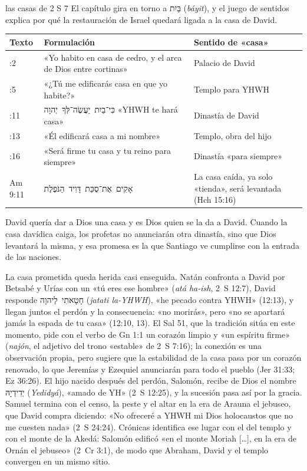 \documentclass[11pt,letterpaper]{article}
\newcommand{\heb}[1]{\mbox{\foreignlanguage{hebrew}{#1}}}
\begin{document}
\begin{perla}{las casas de 2 S 7}
El capítulo gira en torno a \heb{בַּיִת} (\emph{báyit}), y el juego de sentidos explica por qué la restauración de Israel quedará ligada a la casa de David.\par\smallskip
{\centering\renewcommand{\arraystretch}{1.15}
\begin{tabular}{>{\RaggedRight\arraybackslash}p{1.6cm}>{\RaggedRight\arraybackslash}p{7.4cm}>{\RaggedRight\arraybackslash}p{4.9cm}}
\toprule
\textbf{Texto} & \textbf{Formulación} & \textbf{Sentido de «casa»}\\
\midrule
7:2 & «Yo habito en casa de cedro, y el arca de Dios entre cortinas» & Palacio de David\\
7:5 & «¿Tú me edificarás casa en que yo habite?» & Templo para YHWH\\
7:11 & \heb{כִּי־בַיִת יַעֲשֶׂה־לְּךָ יְהוָה} «YHWH te hará casa» & Dinastía de David\\
7:13 & «Él edificará casa a mi nombre» & Templo, obra del hijo\\
7:16 & «Será firme tu casa y tu reino para siempre» & Dinastía «para siempre»\\
Am 9:11 & \heb{אָקִים אֶת־סֻכַּת דָּוִיד הַנֹּפֶלֶת} & La casa caída, ya solo «tienda», será levantada (Hch 15:16)\\
\bottomrule
\end{tabular}\par}
\smallskip
David quería dar a Dios una casa y es Dios quien se la da a David. Cuando la casa davídica caiga, los profetas no anunciarán otra dinastía, sino que Dios levantará la misma, y esa promesa es la que Santiago ve cumplirse con la entrada de las naciones.
\end{perla}

La casa prometida queda herida casi enseguida. Natán confronta a David por Betsabé y Urías con un «tú eres ese hombre» (\emph{atá ha-ish}, 2~S 12:7), David responde \heb{חָטָאתִי לַיהוָה} (\emph{jatati la-YHWH}), «he pecado contra YHWH» (12:13), y llegan juntos el perdón y la consecuencia: «no morirás», pero «no se apartará jamás la espada de tu casa» (12:10, 13). El Sal 51, que la tradición sitúa en este momento, pide con el verbo de Gn 1:1 un corazón limpio y «un espíritu firme» (\emph{najón}, el adjetivo del trono «estable» de 2~S 7:16); la conexión es una observación propia, pero sugiere que la estabilidad de la casa pasa por un corazón renovado, lo que Jeremías y Ezequiel anunciarán para todo el pueblo (Jer 31:33; Ez 36:26). El hijo nacido después del perdón, Salomón, recibe de Dios el nombre \heb{יְדִידְיָהּ} (\emph{Yedidyá}), «amado de YH» (2~S 12:25), y la sucesión pasa así por la gracia. Samuel termina con el censo, la peste y el altar en la era de Arauna el jebuseo, que David compra diciendo: «No ofreceré a YHWH mi Dios holocaustos que no me cuesten nada» (2~S 24:24). Crónicas identifica ese lugar con el del templo y con el monte de la Akedá: Salomón edificó «en el monte Moriah [\ldots], en la era de Ornán el jebuseo» (2~Cr 3:1), de modo que Abraham, David y el templo convergen en un mismo sitio.
\end{document}
